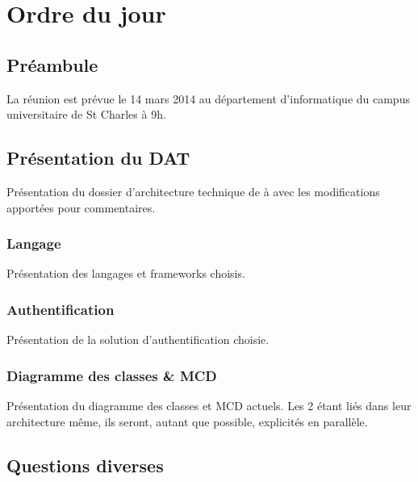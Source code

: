 \documentclass[11pt,fleqn]{report}
\begin{document}
\ZMakeCover


\chapter*{Ordre du jour}
\setcounter{chapter}{1}

\section{Préambule}
La réunion est prévue le 14 mars 2014 au département d'informatique du campus universitaire de St Charles à 9h.

\section{Présentation du DAT}
Présentation du dossier d'architecture technique de \amo à \mo avec les modifications apportées pour commentaires.

\subsection{Langage}
Présentation des langages et frameworks choisis.

\subsection{Authentification}
Présentation de la solution d'authentification choisie.

\subsection{Diagramme des classes \& MCD}
Présentation du diagramme des classes et MCD actuels. Les 2 étant liés dans leur architecture même, ils seront, autant que possible, explicités en parallèle.

\section{Questions diverses}
\end{document}
